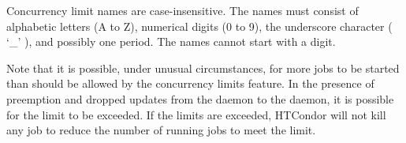 Concurrency limit names are case-insensitive.
The names must consist of alphabetic letters (A to Z), numerical digits
(0 to 9), the underscore character ( `\_' ), and possibly one period.
The names cannot start with a digit.

Note that it is possible, under unusual circumstances, for more jobs to
be started than should be allowed by the concurrency limits feature.
In the presence of preemption and dropped updates from the
 daemon to the  daemon, 
it is possible for the limit to be exceeded. 
If the limits are exceeded,
HTCondor will not kill any job to reduce the number of running jobs to
meet the limit.
